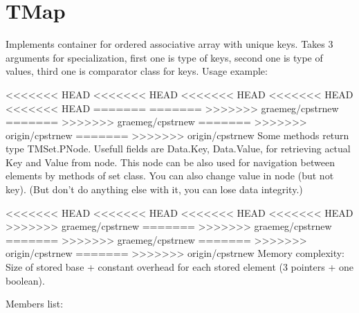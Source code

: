 \chapter{TMap}

Implements container for ordered associative array with unique keys.
Takes 3 arguments for specialization, first one is type of keys, second one is type of values, third
one is comparator class for keys.
Usage example:



<<<<<<< HEAD
<<<<<<< HEAD
<<<<<<< HEAD
<<<<<<< HEAD
<<<<<<< HEAD
=======
=======
>>>>>>> graemeg/cpstrnew
=======
>>>>>>> graemeg/cpstrnew
=======
>>>>>>> origin/cpstrnew
=======
>>>>>>> origin/cpstrnew
Some methods return type TMSet.PNode. Usefull fields are Data.Key, Data.Value, for retrieving
actual Key and Value from node. This node can be also used for navigation between elements by methods of set class.
You can also change value in node (but not key).
(But don't do anything else with it, you can lose data integrity.)

<<<<<<< HEAD
<<<<<<< HEAD
<<<<<<< HEAD
<<<<<<< HEAD
>>>>>>> graemeg/cpstrnew
=======
>>>>>>> graemeg/cpstrnew
=======
>>>>>>> graemeg/cpstrnew
=======
>>>>>>> origin/cpstrnew
=======
>>>>>>> origin/cpstrnew
Memory complexity:
Size of stored base + constant overhead for each stored element (3 pointers + one boolean).

Members list:

